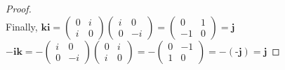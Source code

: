 \documentclass{article} %
\begin{document}
\begin{addmargin}[1em]{0em}
\begin{addmargin}[1em]{0em}
\begin{proof}
\\Finally, $\textbf{k}\textbf{i} = \left( \begin{matrix} 0 & i \\ i & 0 \end{matrix} \right)\left( \begin{matrix} i & 0 \\ 0 & -i \end{matrix} \right) = \left( \begin{matrix} 0 & 1 \\ -1 & 0 \end{matrix} \right) = \textbf{j}$
\\ $-\textbf{i}\textbf{k} = -\left( \begin{matrix} i & 0 \\ 0 & -i \end{matrix} \right)\left( \begin{matrix} 0 & i \\ i & 0 \end{matrix} \right) = -\left( \begin{matrix} 0 & -1 \\ 1 & 0 \end{matrix} \right) = -(\textbf{-j}) = \textbf{j}$
\end{proof}
\end{addmargin}
\end{addmargin}

\newpage
\end{document}
